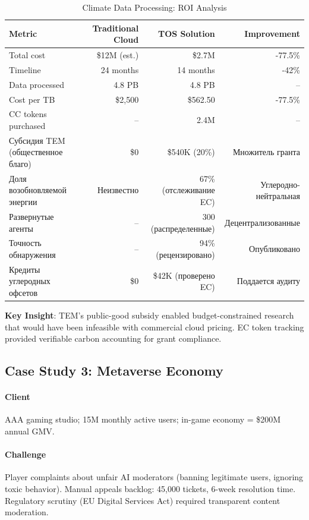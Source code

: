 \documentclass[11pt]{article}
\begin{document}
\begin{table}[H]
\centering
\caption{Climate Data Processing: ROI Analysis}
\label{tab:climate-roi}
\begin{tabular}{@{}lrrr@{}}
\toprule
\textbf{Metric} & \textbf{Traditional Cloud} & \textbf{TOS Solution} & \textbf{Improvement} \\ \midrule
Total cost & \$12M (est.) & \$2.7M & -77.5\% \\
Timeline & 24 months & 14 months & -42\% \\
Data processed & 4.8 PB & 4.8 PB & -- \\
Cost per TB & \$2,500 & \$562.50 & -77.5\% \\
CC tokens purchased & -- & 2.4M & -- \\
Субсидия TEM (общественное благо) & \$0 & \$540K (20\%) & Множитель гранта \\
Доля возобновляемой энергии & Неизвестно & 67\% (отслеживание EC) & Углеродно-нейтральная \\
Развернутые агенты & -- & 300 (распределенные) & Децентрализованные \\
Точность обнаружения & -- & 94\% (рецензировано) & Опубликовано \\
Кредиты углеродных офсетов & \$0 & \$42K (проверено EC) & Поддается аудиту \\
\bottomrule
\end{tabular}
\end{table}

\textbf{Key Insight}: TEM's public-good subsidy enabled budget-constrained research that would have been infeasible with commercial cloud pricing. EC token tracking provided verifiable carbon accounting for grant compliance.

\subsection{Case Study 3: Metaverse Economy}

\paragraph{Client} AAA gaming studio; 15M monthly active users; in-game economy = \$200M annual GMV.

\paragraph{Challenge} Player complaints about unfair AI moderators (banning legitimate users, ignoring toxic behavior). Manual appeals backlog: 45,000 tickets, 6-week resolution time. Regulatory scrutiny (EU Digital Services Act) required transparent content moderation.
\end{document}
